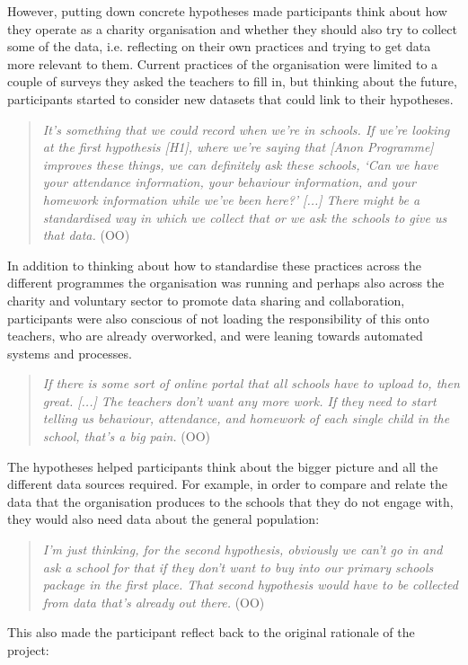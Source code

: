 However, putting down concrete hypotheses made participants think about how they operate as a charity organisation and whether they should also try to collect some of the data, i.e. reflecting on their own practices and trying to get data more relevant to them. Current practices of the organisation were limited to a couple of surveys they asked the teachers to fill in, but thinking about the future, participants started to consider new datasets that could link to their hypotheses.
\begin{quote}
    \textit{It's something that we could record when we're in schools. If we're looking at the first hypothesis [H1], where we're saying that [Anon Programme] improves these things, we can definitely ask these schools, `Can we have your attendance information, your behaviour information, and your homework information while we've been here?' [...] There might be a standardised way in which we collect that or we ask the schools to give us that data.} (OO)
\end{quote}
In addition to thinking about how to standardise these practices across the different programmes the organisation was running and perhaps also across the charity and voluntary sector to promote data sharing and collaboration, participants were also conscious of not loading the responsibility of this onto teachers, who are already overworked, and were leaning towards automated systems and processes.
\begin{quote}
    \textit{If there is some sort of online portal that all schools have to upload to, then great. [...] The teachers don't want any more work. If they need to start telling us behaviour, attendance, and homework of each single child in the school, that's a big pain.} (OO)
\end{quote}
The hypotheses helped participants think about the bigger picture and all the different data sources required. For example, in order to compare and relate the data that the organisation produces to the schools that they do not engage with, they would also need data about the general population:
\begin{quote}
    \textit{I'm just thinking, for the second hypothesis, obviously we can't go in and ask a school for that if they don't want to buy into our primary schools package in the first place. That second hypothesis would have to be collected from data that's already out there.} (OO)
\end{quote}
This also made the participant reflect back to the original rationale of the project: 
